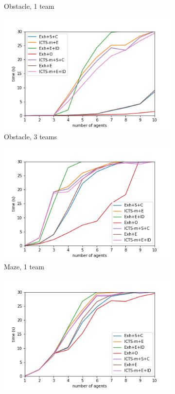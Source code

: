 \documentclass[english]{article}
\begin{document}
\begin{figure}
\begin{subfigure}{0.49\textwidth}
			\caption{Obstacle, 1 team}
			\label{fig:obstacle1}
		\end{subfigure}
		\begin{subfigure}{0.49\textwidth}
			\centering
			\includegraphics[width=\linewidth]{img/results/obstacle-3}
			\caption{Obstacle, 3 teams}
			\label{fig:obstacle3}
		\end{subfigure}
		\begin{subfigure}{0.49\textwidth}
			\centering
			\includegraphics[width=\linewidth]{img/results/maze-1}
			\caption{Maze, 1 team}
			\label{fig:m1}
		\end{subfigure}
		\begin{subfigure}{0.49\textwidth}
			\centering
			\includegraphics[width=\linewidth]{img/results/maze-3}

\end{subfigure}
\end{figure}
\end{document}
